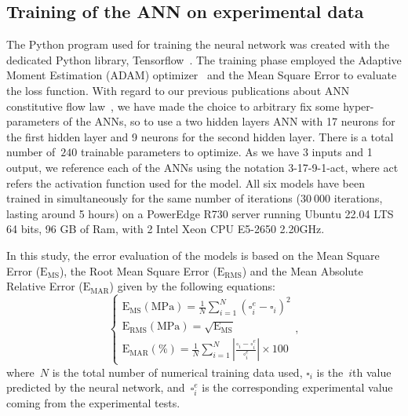 \documentclass[algorithms,article,submit,pdftex,oneauthors]{Definitions/mdpi}
\DeclareRobustCommand{\MSE}{\text{E}_\text{MS}}
\DeclareRobustCommand{\RMSE}{\text{E}_\text{RMS}}
\DeclareRobustCommand{\MARE}{\text{E}_\text{MAR}}
\DeclareRobustCommand{\MPa}{\text{MPa}}
\begin{document}
\subsection{Training of the ANN on experimental data}\label{subsec:train}

The Python program used for training the neural network was created with the dedicated Python library, Tensorflow~\cite{Tensorflow-2015}.
The training phase employed the Adaptive Moment Estimation (ADAM) optimizer~\cite{Kingma-2015-AMS} and the Mean Square Error to evaluate the loss function.
With regard to our previous publications about ANN constitutive flow law~\cite{Pantale-2021-EIN}, we have made the choice to arbitrary fix some hyper-parameters of the ANNs, so to use a two hidden layers ANN with 17 neurons for the first hidden layer and 9 neurons for the second hidden layer.
There is a total number of~$240$ trainable parameters to optimize.
As we have 3 inputs and 1 output, we reference each of the ANNs using the notation 3-17-9-1-act, where act refers the activation function used for the model.
All six models have been trained in simultaneously for the same number of iterations ($30~000$ iterations, lasting around 5 hours) on a PowerEdge R730 server running Ubuntu 22.04 LTS 64 bits, 96 GB of Ram, with 2 Intel Xeon CPU E5-2650 2.20GHz.

In this study, the error evaluation of the models is based on the Mean Square Error ($\MSE$), the Root Mean Square Error ($\RMSE$) and the Mean Absolute Relative Error ($\MARE$) given by the following equations:
\begin{equation}
\begin{cases}
\MSE (\MPa) = \frac{1}{N} \sum_{i=1}^{N} \left(\square_i^e - \square_i\right)^2\\
\RMSE (\MPa) = \sqrt{\MSE}\\
\MARE(\%) = \frac{1}{N} \sum_{i=1}^{N}{\left|\frac{\square_i -\square_i^e}{\square_i^e}\right|} \times 100
\end{cases},
\label{eq:Errors}
\end{equation}
where~$N$ is the total number of numerical training data used, $\square_i$ is the~$i$th value predicted by the neural network, and~$\square_i^e$ is the corresponding experimental value coming from the experimental tests.
\end{document}
